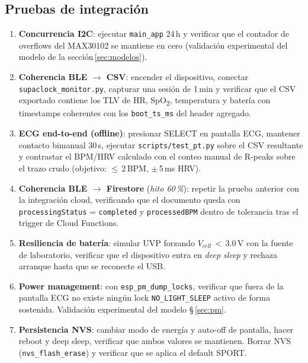 \documentclass[letterpaper,11pt]{article}
\begin{document}
\subsection{Pruebas de integración}
\begin{enumerate}
    \item \textbf{Concurrencia I2C}: ejecutar \texttt{main\_app} 24\,h y verificar que
    el contador de overflows del MAX30102 se mantiene en cero (validación experimental del
    modelo de la sección\,\ref{sec:modelos}).
    \item \textbf{Coherencia BLE $\to$ CSV}: encender el dispositivo, conectar
    \texttt{supaclock\_monitor.py}, capturar una sesión de 1\,min y verificar que el CSV
    exportado contiene los TLV de HR, SpO\textsubscript{2}, temperatura y batería con
    timestamps coherentes con los \texttt{boot\_ts\_ms} del header agregado.
    \item \textbf{ECG end-to-end (offline)}: presionar SELECT en pantalla ECG, mantener
    contacto bimanual 30\,s, ejecutar \texttt{scripts/test\_pt.py} sobre el CSV resultante y
    contrastar el BPM/HRV calculado con el conteo manual de R-peaks sobre el trazo crudo
    (objetivo: $\leq$\,2\,BPM, $\pm$\,5\,ms HRV).
    \item \textbf{Coherencia BLE $\to$ Firestore} (\textit{hito 60\,\%}): repetir la prueba
    anterior con la integración cloud, verificando que el documento queda con
    \texttt{processingStatus} = \texttt{completed} y \texttt{processedBPM} dentro de
    tolerancia tras el trigger de Cloud Functions.
    \item \textbf{Resiliencia de batería}: simular UVP forzando $V_{cell}$\,$<$\,3.0\,V con la
    fuente de laboratorio, verificar que el dispositivo entra en \textit{deep sleep} y rechaza
    arranque hasta que se reconecte el USB.
    \item \textbf{Power management}: con \texttt{esp\_pm\_dump\_locks}, verificar que fuera de
    la pantalla ECG no existe ningún lock \texttt{NO\_LIGHT\_SLEEP} activo de forma sostenida.
    Validación experimental del modelo §\,\ref{sec:pm}.
    \item \textbf{Persistencia NVS}: cambiar modo de energía y auto-off de pantalla, hacer
    reboot y deep sleep, verificar que ambos valores se mantienen. Borrar NVS
    (\texttt{nvs\_flash\_erase}) y verificar que se aplica el default SPORT.
\end{enumerate}
\end{document}
